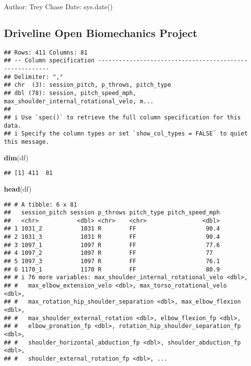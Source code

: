 \documentclass[
]{article}
\author{}
\date{\vspace{-2.5em}}
\newenvironment{Shaded}{\begin{snugshade}}{\end{snugshade}}
\newcommand{\FunctionTok}[1]{\textcolor[rgb]{0.13,0.29,0.53}{\textbf{#1}}}
\newcommand{\NormalTok}[1]{#1}
\begin{document}
Author: Trey Chase Date: sys.date()

\subsection{Driveline Open Biomechanics
Project}\label{driveline-open-biomechanics-project}

\begin{verbatim}
## Rows: 411 Columns: 81
## -- Column specification --------------------------------------------------------
## Delimiter: ","
## chr  (3): session_pitch, p_throws, pitch_type
## dbl (78): session, pitch_speed_mph, max_shoulder_internal_rotational_velo, m...
## 
## i Use `spec()` to retrieve the full column specification for this data.
## i Specify the column types or set `show_col_types = FALSE` to quiet this message.
\end{verbatim}

\begin{Shaded}
\begin{Highlighting}[]
\FunctionTok{dim}\NormalTok{(df)}
\end{Highlighting}
\end{Shaded}

\begin{verbatim}
## [1] 411  81
\end{verbatim}

\begin{Shaded}
\begin{Highlighting}[]
\FunctionTok{head}\NormalTok{(df)}
\end{Highlighting}
\end{Shaded}

\begin{verbatim}
## # A tibble: 6 x 81
##   session_pitch session p_throws pitch_type pitch_speed_mph
##   <chr>           <dbl> <chr>    <chr>                <dbl>
## 1 1031_2           1031 R        FF                    90.4
## 2 1031_3           1031 R        FF                    90.4
## 3 1097_1           1097 R        FF                    77.6
## 4 1097_2           1097 R        FF                    77  
## 5 1097_3           1097 R        FF                    76.1
## 6 1170_1           1170 R        FF                    80.9
## # i 76 more variables: max_shoulder_internal_rotational_velo <dbl>,
## #   max_elbow_extension_velo <dbl>, max_torso_rotational_velo <dbl>,
## #   max_rotation_hip_shoulder_separation <dbl>, max_elbow_flexion <dbl>,
## #   max_shoulder_external_rotation <dbl>, elbow_flexion_fp <dbl>,
## #   elbow_pronation_fp <dbl>, rotation_hip_shoulder_separation_fp <dbl>,
## #   shoulder_horizontal_abduction_fp <dbl>, shoulder_abduction_fp <dbl>,
## #   shoulder_external_rotation_fp <dbl>, ...
\end{verbatim}
\end{document}
